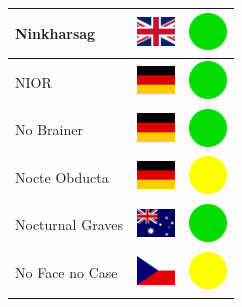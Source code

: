 \documentclass[12pt, a4paper, twoside]{report}
\begin{document}
\begin{center}
\begin{longtable}{|p{5cm}|p{2cm}|p{2cm}|}
 Ninkharsag                                                 & \includegraphics[width=1cm]{4x3/gb} &   \includegraphics[width=1cm]{likes/y} \\ \hline
 NIOR                                                       & \includegraphics[width=1cm]{4x3/de} &   \includegraphics[width=1cm]{likes/y} \\ \hline
 No Brainer                                                 & \includegraphics[width=1cm]{4x3/de} &   \includegraphics[width=1cm]{likes/y} \\ \hline
 Nocte Obducta                                              & \includegraphics[width=1cm]{4x3/de} &   \includegraphics[width=1cm]{likes/m} \\ \hline
 Nocturnal Graves                                           & \includegraphics[width=1cm]{4x3/au} &   \includegraphics[width=1cm]{likes/y} \\ \hline
 No Face no Case                                            & \includegraphics[width=1cm]{4x3/cz} &   \includegraphics[width=1cm]{likes/m} \\ \hline

\end{longtable}
\end{center}
\end{document}
